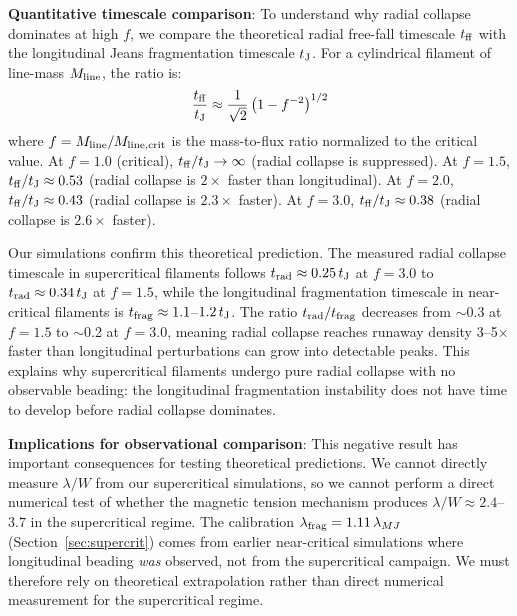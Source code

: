 \documentclass[twoside,twocolumn]{mnras}
\begin{document}
\textbf{Quantitative timescale comparison}: To understand why radial collapse dominates at high $f$, we compare the theoretical radial free-fall timescale $t_{\rm ff}$ with the longitudinal Jeans fragmentation timescale $t_{\rm J}$. For a cylindrical filament of line-mass $M_{\rm line}$, the ratio is:
\begin{equation}
\frac{t_{\rm ff}}{t_{\rm J}} \approx \frac{1}{\sqrt{2}} \left(1 - f^{-2}\right)^{1/2}
\end{equation}
where $f = M_{\rm line}/M_{\rm line,crit}$ is the mass-to-flux ratio normalized to the critical value. At $f = 1.0$ (critical), $t_{\rm ff}/t_{\rm J} \to \infty$ (radial collapse is suppressed). At $f = 1.5$, $t_{\rm ff}/t_{\rm J} \approx 0.53$ (radial collapse is $2\times$ faster than longitudinal). At $f = 2.0$, $t_{\rm ff}/t_{\rm J} \approx 0.43$ (radial collapse is $2.3\times$ faster). At $f = 3.0$, $t_{\rm ff}/t_{\rm J} \approx 0.38$ (radial collapse is $2.6\times$ faster).

Our simulations confirm this theoretical prediction. The measured radial collapse timescale in supercritical filaments follows $t_{\rm rad} \approx 0.25\,t_{\rm J}$ at $f = 3.0$ to $t_{\rm rad} \approx 0.34\,t_{\rm J}$ at $f = 1.5$, while the longitudinal fragmentation timescale in near-critical filaments is $t_{\rm frag} \approx 1.1$--$1.2\,t_{\rm J}$. The ratio $t_{\rm rad}/t_{\rm frag}$ decreases from $\sim$0.3 at $f = 1.5$ to $\sim$0.2 at $f = 3.0$, meaning radial collapse reaches runaway density 3--5$\times$ faster than longitudinal perturbations can grow into detectable peaks. This explains why supercritical filaments undergo pure radial collapse with no observable beading: the longitudinal fragmentation instability does not have time to develop before radial collapse dominates.

\textbf{Implications for observational comparison}: This negative result has important consequences for testing theoretical predictions. We cannot directly measure $\lambda/W$ from our supercritical simulations, so we cannot perform a direct numerical test of whether the magnetic tension mechanism produces $\lambda/W \approx 2.4$--$3.7$ in the supercritical regime. The calibration $\lambda_{\rm frag} = 1.11\,\lambda_{MJ}$ (Section~\ref{sec:supercrit}) comes from earlier near-critical simulations where longitudinal beading \textit{was} observed, not from the supercritical campaign. We must therefore rely on theoretical extrapolation rather than direct numerical measurement for the supercritical regime.
\end{document}
